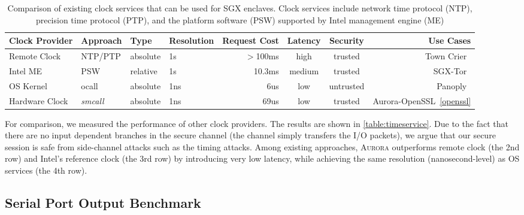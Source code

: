 \begin{table}[t]
	\centering
	\caption{Comparison of existing clock services that can be used for SGX enclaves. Clock services include network time protocol (NTP), precision time protocol (PTP), and the platform software (PSW) supported by Intel management engine (ME)}
	\label{table:timeservice}
	\small
	\begin{tabular}{llllrccr}%
		\toprule
		\textbf{Clock Provider} & \textbf{Approach} & \textbf{Type} & \textbf{Resolution} & \textbf{Request Cost} & \textbf{Latency} & \textbf{Security} & \textbf{Use Cases} \\
		\midrule
		Remote Clock & NTP/PTP & absolute & 1s & $>$100ms & high & trusted & Town Crier~\cite{DBLP:conf/ccs/ZhangCCJS16} \\
		Intel ME & PSW & relative & 1s & 10.3ms & medium & trusted & SGX-Tor~\cite{DBLP:conf/nsdi/KimHHKH17} \\
		OS Kernel & ocall & absolute & 1ns & 6us & low & untrusted & Panoply~\cite{shinde_panoply:_2017} \\
		Hardware Clock & \textit{smcall} & absolute & 1ns & 69us & low & trusted & Aurora-OpenSSL~\ref{openssl} \\
		\bottomrule
	\end{tabular}
\end{table}

For comparison, we measured the performance of other clock providers. The results are shown in \autoref{table:timeservice}. Due to the fact that there are no input dependent branches in the secure channel (the channel simply transfers the I/O packets), we argue that our secure session is safe from side-channel attacks such as the timing attacks. 
Among existing approaches, \textsc{Aurora} outperforms remote clock (the 2nd row) and Intel's reference clock (the 3rd row) by introducing very low latency, while achieving the same resolution (nanosecond-level) as OS services (the 4th row). 

\subsection{Serial Port Output Benchmark}

